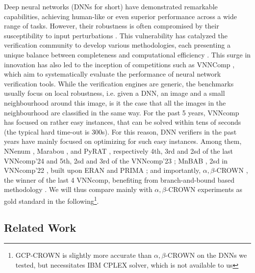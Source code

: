 

Deep neural networks (DNNs for short) have demonstrated remarkable capabilities, achieving human-like or even superior performance across a wide range of tasks. However, their robustness is often compromised by their susceptibility to input perturbations \cite{szegedy}. This vulnerability has catalyzed the verification community to develop various methodologies, each presenting a unique balance between completeness and computational efficiency \cite{Marabou,Reluplex,deeppoly}. This surge in innovation has also led to the inception of competitions such as VNNComp \cite{VNNcomp}, which aim to systematically evaluate the performance of neural network verification tools. While the verification engines are generic, the benchmarks usually focus on local robustness, i.e. given a DNN, an image and a small neighbourhood around this image, is it the case that all the images in the neighbourhood are classified in the same way. 
For the past 5 years, VNNcomp has focused on rather easy instances, that can be solved within tens of seconds (the typical hard time-out is 300s). For this reason, DNN verifiers in the past years have mainly focused on optimizing for such easy instances. Among them, NNenum \cite{nnenum}, Marabou \cite{Marabou,Marabou2}, and PyRAT 
\cite{pyrat}, respectively 4th, 3rd and 2sd of the last VNNcomp'24 \cite{VNNcomp24}
and 5th, 2sd and 3rd  of the VNNcomp'23 \cite{VNNcomp23}; MnBAB \cite{ferrari2022complete}, 2sd in VNNcomp'22 \cite{VNNcomp22}, built upon ERAN \cite{deeppoly} and PRIMA \cite{prima}; and importantly, $\alpha,\beta$-CROWN \cite{crown,xu2020fast}, the winner of the last 4 VNNcomp, benefiting from branch-and-bound based methodology \cite{cutting,BaB}.
We will thus compare mainly with $\alpha,\beta$-CROWN experiments as gold standard in the following\footnote{GCP-CROWN \cite{cutting} is slightly more accurate than $\alpha,\beta$-CROWN on the DNNs we tested, but necessitates IBM CPLEX solver, which is not available to us}.

\subsection{Related Work} 
